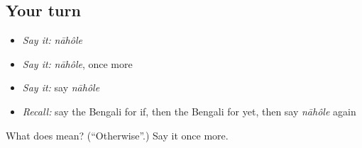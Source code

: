 \subsection*{Your turn}
\begin{itemize}
\raggedright
  \item \emph{Say it:} \emph{nāhôle}
  \item \emph{Say it:} \emph{nāhôle}, once more
  \item \emph{Say it:} say \emph{nāhôle}
  \item \emph{Recall:} say the Bengali for if, then the Bengali for yet, then say \emph{nāhôle} again
\end{itemize}

\begin{tcolorbox}[breakable,colback=teal!4,colframe=teal!35!black,title={Before you move on}]
What does  mean? (\textquotedblleft{}Otherwise\textquotedblright{}.) Say it once more.
\end{tcolorbox}
